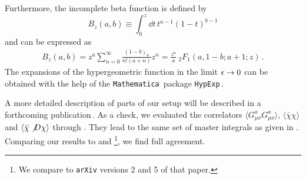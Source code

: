 Furthermore, the incomplete beta function is defined by
\begin{equation}
  B_z (a, b) \equiv \int_0^z\dd t\, t^{a-1}(1-t)^{b-1}
\end{equation}
and can be expressed as
\begin{equation}
  \begin{split}
    B_z(a,b) =  z^a \sum_{n = 0}^\infty \frac{(1 - b)_n}{n! (a + n)} z^n
    = \frac{z^a}{a}\ {}_2F_1(a,1-b;a+1;z)\,.
  \end{split}
\end{equation}
The expansions of the hypergeometric function in the limit $\ep\to 0$
can be obtained with the help of the
\texttt{Mathematica}\,\cite{Mathematica11.3} package
\texttt{HypExp}\,\cite{Huber:2005yg,Huber:2007dx}.

A more detailed description of parts of our setup will be described in a
forthcoming publication\,\cite{Artz:2019bpr}. As a check, we evaluated the
correlators $\langle G_{\mu\nu}^aG_{\mu\nu}^a\rangle$, $\langle
\bar\chi\chi\rangle$ and $\langle \bar\chi \slashed D \chi\rangle$
through \nlo. They lead to the same set of master integrals as given in
. Comparing our results to  and
\footnote{We compare to \texttt{arXiv} versions 2
  and 5 of that paper.}, we find full agreement.
